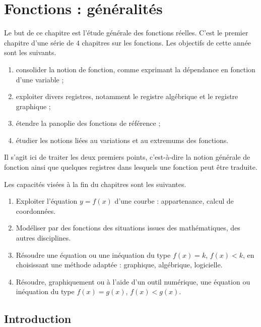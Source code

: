 \chapter{Fonctions : généralités}

Le but de ce chapitre est l'étude générale des fonctions réelles.
C'est le premier chapitre d'une série de $4$ chapitres sur les fonctions.
Les objectifs de cette année sont les suivants.
	\begin{enumerate}[label=$\bullet$]
		\item consolider la notion de fonction, comme exprimant la dépendance en fonction d'une variable ; 
		\item exploiter divers registres, notamment le registre algébrique et le registre graphique ;
		\item étendre la panoplie des fonctions de référence ;
		\item étudier les notions liées au variations et au extremums des fonctions.
	\end{enumerate}
Il s'agit ici de traiter les deux premiers points, c'est-à-dire la notion générale de fonction ainsi que quelques registres dans lesquels une fonction peut être traduite.

Les capacités visées à la fin du chapitres sont les suivantes.
	\begin{enumerate}
		\item Exploiter l'équation $y=f(x)$ d'une courbe : appartenance, calcul de coordonnées.
		\item Modéliser par des fonctions des situations issues des mathématiques, des autres disciplines.
		\item Résoudre une équation ou une inéquation du type $f(x)=k$, $f(x) < k$, en choisissant une méthode adaptée : graphique, algébrique, logicielle.
		\item Résoudre, graphiquement ou à l'aide d'un outil numérique, une équation ou inéquation du type $f(x)=g(x)$, $f(x) < g(x)$.
	\end{enumerate}

	\section{Introduction}
	
